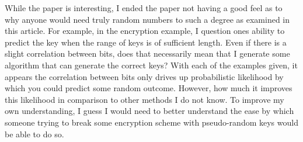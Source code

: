 \documentclass[fontsize=12pt]{article}
\numberwithin{equation}{section} %
\numberwithin{figure}{section} %
\numberwithin{table}{section} %
\begin{document}
\par While the paper is interesting, I ended the paper not having a good feel
as to why anyone would need truly random numbers to such a degree as examined
in this article.  For example, in the encryption example, I question ones
ability to predict the key when the range of keys is of sufficient length.
Even if there is a slight correlation between bits, does that necessarily mean
that I generate some algorithm that can generate the correct keys?  With each
of the examples given, it appears the correlation between bits only drives up
probabilistic likelihood by which you could predict some random outcome.
However, how much it improves this likelihood in comparison to other methods I
do not know.  To improve my own understanding, I guess I would need to better
understand the ease by which someone trying to break some encryption scheme
with pseudo-random keys would be able to do so.
\end{document}
